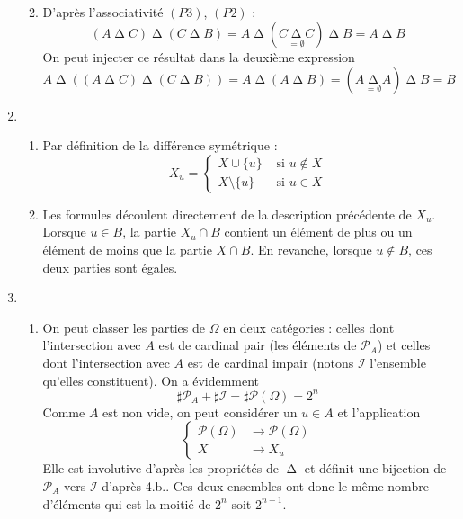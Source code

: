 \begin{enumerate}
\begin{enumerate}
\begin{multline*}
\end{multline*}
\item D'après l'associativité $(P3)$, $(P2)$ :
\begin{displaymath}
\left(A \mathop{\Delta}  C \right) \mathop{\Delta}  \left(C \mathop{\Delta}  B \right)
=A \mathop{\Delta}  \left(\underset{=\emptyset}{C  \mathop{\Delta}  C}\right) \mathop{\Delta}  B 
=A \mathop{\Delta}  B
\end{displaymath}
On peut injecter ce résultat dans la deuxième expression
\begin{displaymath}
A \mathop{\Delta} \left( \left(A \mathop{\Delta}  C \right) \mathop{\Delta}  \left(C \mathop{\Delta}  B \right)\right)
=A \mathop{\Delta} \left( A \mathop{\Delta}  B \right)
= \left(\underset{=\emptyset}{A \mathop{\Delta}  A}\right) \mathop{\Delta}  B = B
\end{displaymath}
\end{enumerate}

\item \begin{enumerate}
 \item Par définition de la différence symétrique :
\begin{displaymath}
 X_u = \left\lbrace 
\begin{aligned}
 X\cup\{u\} &\text{ si } u\notin X \\
 X\setminus \{u\} &\text{ si } u\in X
\end{aligned}
\right. 
\end{displaymath}
\item Les formules découlent directement de la description précédente de $X_u$. Lorsque $u\in B$, la partie $X_u \cap B$ contient un élément de plus ou un élément de moins que la partie $X\cap B$. En revanche, lorsque $u\notin B$, ces deux parties sont égales. 
\end{enumerate}

\item \begin{enumerate}
 \item On peut classer les parties de $\Omega$ en deux catégories : celles dont l'intersection avec $A$ est de cardinal pair (les éléments de $\mathcal P_A$) et celles dont l'intersection avec $A$ est de cardinal impair (notons $\mathcal I$ l'ensemble qu'elles constituent). On a évidemment
\begin{displaymath}
 \sharp \mathcal P_A + \sharp \mathcal I = \sharp \mathcal P(\Omega)=2^n
\end{displaymath}
Comme $A$ est non vide, on peut considérer un $u\in A$ et l'application
\begin{displaymath}
 \left\lbrace 
\begin{aligned}
 \mathcal P(\Omega) &\rightarrow \mathcal P(\Omega) \\
 X &\rightarrow X_u
\end{aligned}
\right. 
\end{displaymath}
Elle est involutive d'après les propriétés de $ \mathop{\Delta} $ et définit une bijection de $\mathcal P_A$ vers $\mathcal I$ d'après 4.b.. Ces deux ensembles ont donc le même nombre d'éléments qui est la moitié de $2^n$ soit $2^{n-1}$.


\end{enumerate}
\end{enumerate}
